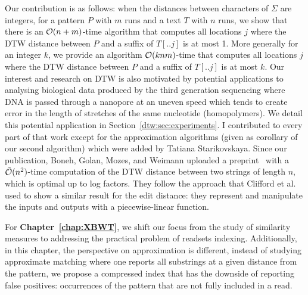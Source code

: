 Our contribution is as follows: when the distances between characters of $\Sigma$ are integers, for a pattern $P$ with $m$ runs and a text $T$ with $n$ runs, we show that there is an $\mathcal{O}(n+m)$-time algorithm that computes all locations $j$ where the DTW distance between $P$ and a suffix of $T[..j]$ is at most 1. More generally for an integer $k$, we provide an algorithm $\mathcal{O}(knm)$-time that computes all locations $j$ where the DTW distance between $P$ and a suffix of $T[..j]$ is at most $k$.
Our interest and research on DTW is also motivated by potential applications to analysing biological data produced by the third generation sequencing where DNA is passed through a nanopore at an uneven speed which tends to create error in the length of stretches of the same nucleotide (homopolymers). We detail this potential application in Section~\ref{dtw:sec:experiments}.
I contributed to every part of that work except for the approximation algorithms (given as corollary of our second algorithm) which were added by Tatiana Starikovskaya.
Since our publication, Boneh, Golan, Mozes, and Weimann uploaded a preprint~\cite{boneh2023near} with a $\tilde{\mathcal{O}}(n^2)$-time computation of the DTW distance between two strings of length $n$, which is optimal up to log factors. They follow the approach that Clifford et al.~\cite{clifford2019rle} used to show a similar result for the edit distance: they represent and manipulate the inputs and outputs with a piecewise-linear function.



For \textbf{Chapter~\ref{chap:XBWT}}, we shift our focus from the study of similarity measures to addressing the practical problem of readsets indexing. 
Additionally, in this chapter, the perspective on approximation is different, instead of studying approximate matching where one reports all substrings at a given distance from the pattern, we propose a compressed index that has the downside of reporting false positives: occurrences of the pattern that are not fully included in a read.

